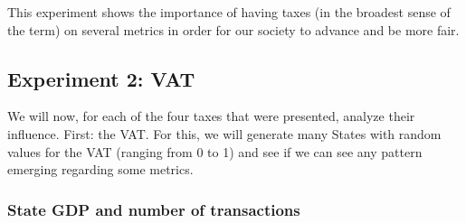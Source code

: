         This experiment shows the importance of having taxes (in the broadest sense of the term) on several metrics in order for our society to advance and be more fair.

    \subsection{Experiment 2: VAT}\label{section:expVAT}
    We will now, for each of the four taxes that were presented, analyze their influence. First: the VAT. For this, we will generate many States with random values for the VAT (ranging from 0 to 1) and see if we can see any pattern emerging regarding some metrics.

        \subsubsection{State GDP and number of transactions}

